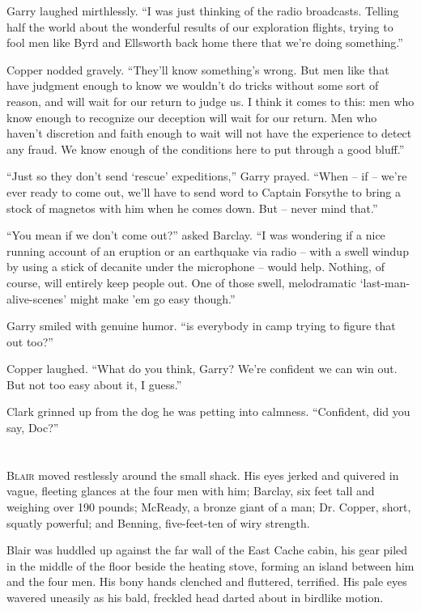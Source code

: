 \documentclass[ebook,oneside,11pt]{memoir}				%
\begin{document}
Garry laughed mirthlessly. ``I was just thinking of the radio broadcasts. Telling half the world about the wonderful results of our exploration flights, trying to fool men like Byrd and Ellsworth back home there that we're doing something.''

Copper nodded gravely. ``They'll know something's wrong. But men like that have judgment enough to know we wouldn't do tricks without some sort of reason, and will wait for our return to judge us. I think it comes to this: men who know enough to recognize our deception will wait for our return. Men who haven't discretion and faith enough to wait will not have the experience to detect any fraud. We know enough of the conditions here to put through a good bluff.''

``Just so they don't send `rescue' expeditions,'' Garry prayed. ``When -- if -- we're ever ready to come out, we'll have to send word to Captain Forsythe to bring a stock of magnetos with him when he comes down. But -- never mind that.''

``You mean if we don't come out?'' asked Barclay. ``I was wondering if a nice running account of an eruption or an earthquake via radio -- with a swell windup by using a stick of decanite under the microphone -- would help. Nothing, of course, will entirely keep people out. One of those swell, melodramatic `last-man-alive-scenes' might make 'em go easy though.''

Garry smiled with genuine humor. ``is everybody in camp trying to figure that out too?''

Copper laughed. ``What do you think, Garry? We're confident we can win out. But not too easy about it, I guess.''

Clark grinned up from the dog he was petting into calmness. ``Confident, did you say, Doc?'' 

\chapter[Chapter 8]{}
\lettrine[lines=3,findent=2pt,nindent=2pt]{B}{lair} moved restlessly around the small shack. His eyes jerked and quivered in vague, fleeting glances at the four men with him; Barclay, six feet tall and weighing over 190 pounds; McReady, a bronze giant of a man; Dr. Copper, short, squatly powerful; and Benning, five-feet-ten of wiry strength.

Blair was huddled up against the far wall of the East Cache cabin, his gear piled in the middle of the floor beside the heating stove, forming an island between him and the four men. His bony hands clenched and fluttered, terrified. His pale eyes wavered uneasily as his bald, freckled head darted about in birdlike motion.
\end{document}
